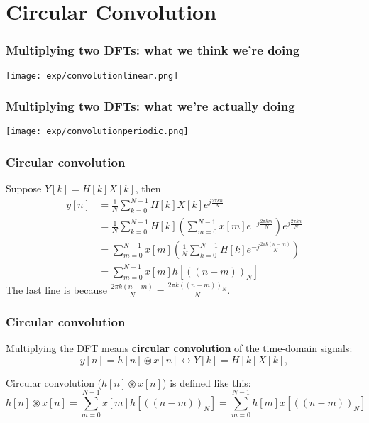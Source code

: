 \documentclass{beamer}
\begin{document}
\section[Circular Convolution]{Circular Convolution}
\setcounter{subsection}{1}

\begin{frame}
  \frametitle{Multiplying two DFTs: what we think we're doing}

  \centerline{\texttt{[image: exp/convolutionlinear.png]}}
\end{frame}

\begin{frame}
  \frametitle{Multiplying two DFTs: what we're actually doing}

  \centerline{\texttt{[image: exp/convolutionperiodic.png]}}
\end{frame}

\begin{frame}
  \frametitle{Circular convolution}

  Suppose $Y[k]=H[k]X[k]$, then
  \begin{align*}
    y[n] &= \frac{1}{N}\sum_{k=0}^{N-1} H[k]X[k]e^{j\frac{2\pi kn}{N}}\\
    &= \frac{1}{N}\sum_{k=0}^{N-1} H[k]\left(\sum_{m=0}^{N-1} x[m]e^{-j\frac{2\pi km}{N}}\right)
    e^{j\frac{2\pi kn}{N}}\\
    &= \sum_{m=0}^{N-1}x[m]\left(\frac{1}{N}\sum_{k=0}^{N-1} H[k]e^{-j\frac{2\pi k(n-m)}{N}}\right)\\
    &= \sum_{m=0}^{N-1} x[m] h\left[(\!(n-m)\!)_N\right]
  \end{align*}
  The last line is because $\frac{2\pi k(n-m)}{N}=\frac{2\pi k(\!(n-m)\!)_N}{N}$.
\end{frame}

\begin{frame}
  \frametitle{Circular convolution}

  Multiplying the DFT means {\bf circular convolution} of the time-domain signals:
  \begin{displaymath}
    y[n]=h[n]\circledast x[n] \leftrightarrow Y[k] = H[k]X[k],
  \end{displaymath}
  
  Circular convolution ($h[n]\circledast x[n]$) is defined like this:
  \begin{displaymath}
    h[n]\circledast x[n] = \sum_{m=0}^{N-1}x[m]h\left[(\!(n-m)\!)_N\right]
    = \sum_{m=0}^{N-1}h[m]x\left[(\!(n-m)\!)_N\right]
  \end{displaymath}
\end{frame}
\end{document}
